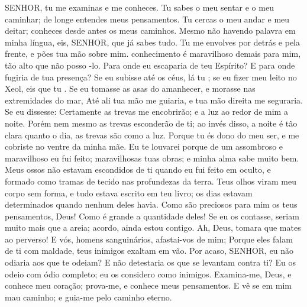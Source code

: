 {\PP 
  SENHOR, tu me examinas e me conheces.
  Tu sabes o meu sentar e o meu caminhar; de longe entendes meus pensamentos.
  Tu cercas o meu andar e meu deitar; conheces desde antes os meus caminhos.
  Mesmo não havendo
{} palavra
{} em minha língua, eis, SENHOR, que já sabes tudo.
  Tu me envolves por detrás e pela frente, e pões tua mão sobre mim.
   conhecimento é maravilhoso demais para mim, tão alto que não posso
{} -lo.
  Para onde eu escaparia de teu Espírito? E para onde fugiria de tua presença?
  Se eu subisse até os céus, lá tu
{} ; se eu fizer meu leito no Xeol,
 eis que tu
{} .
  Se eu tomasse as asas do amanhecer, e morasse nas extremidades do mar,
  Até ali tua mão me guiaria, e tua mão direita me seguraria.
  Se eu dissesse: Certamente as trevas me encobrirão; e a luz ao redor de mim
{} a noite.
  Porém nem mesmo as trevas
{} esconderão de ti; ao invés disso,
{} a noite é tão clara quanto o dia,
{} as trevas são como a luz.
  Porque tu és dono do meu ser, e me cobriste no ventre da minha mãe.
  Eu te louvarei porque de um
{} assombroso e maravilhoso eu fui feito; maravilhosas
{} tuas obras; e minha alma sabe muito bem.
  Meus ossos não estavam escondidos de ti quando eu fui feito em oculto, e formado como tramas de tecido nas profundezas da terra.
  Teus olhos viram meu corpo
{} sem forma, e tudo estava escrito em teu livro;
{} os dias estavam determinados quando nenhum deles
{} havia.
  Como são preciosos para mim os teus pensamentos, Deus! Como é grande a quantidade deles!
  Se eu os contasse, seriam muito mais
{} que a areia;
{} acordo, ainda estou contigo.
  Ah, Deus, tomara que mates ao perverso! E vós, homens sanguinários, afastai-vos de mim;
  Porque eles falam de ti com maldade,
{} teus inimigos
{} exaltam em vão.
  Por acaso, SENHOR, eu não odiaria aos que te odeiam? E não detestaria os que se levantam contra ti?
  Eu os odeio com ódio completo; eu os considero como inimigos.
  Examina-me, Deus, e conhece meu coração; prova-me, e conhece meus pensamentos.
  E vê se em mim
{} mau caminho; e guia-me pelo caminho eterno.
\par }

